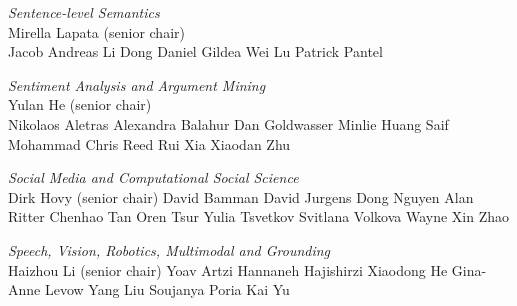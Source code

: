 \emph{Sentence-level Semantics} \\
\hspace*{0.2in}Mirella Lapata (senior chair) \\
\hspace*{0.2in}Jacob Andreas
\hspace*{0.2in}Li Dong
\hspace*{0.2in}Daniel Gildea
\hspace*{0.2in}Wei Lu
\hspace*{0.2in}Patrick Pantel


\emph{Sentiment Analysis and Argument Mining} \\
\hspace*{0.2in}Yulan He (senior chair) \\ 
\hspace*{0.2in}Nikolaos Aletras
\hspace*{0.2in}Alexandra Balahur
\hspace*{0.2in}Dan Goldwasser
\hspace*{0.2in}Minlie Huang
\hspace*{0.2in}Saif Mohammad
\hspace*{0.2in}Chris Reed
\hspace*{0.2in}Rui Xia
\hspace*{0.2in}Xiaodan Zhu


\emph{Social Media and Computational Social Science} \\
\hspace*{0.2in}Dirk Hovy (senior chair)
\hspace*{0.2in}David Bamman
\hspace*{0.2in}David Jurgens
\hspace*{0.2in}Dong Nguyen
\hspace*{0.2in}Alan Ritter
\hspace*{0.2in}Chenhao Tan
\hspace*{0.2in}Oren Tsur
\hspace*{0.2in}Yulia Tsvetkov
\hspace*{0.2in}Svitlana Volkova
\hspace*{0.2in}Wayne Xin Zhao


\emph{Speech, Vision, Robotics, Multimodal and Grounding} \\
\hspace*{0.2in}Haizhou Li (senior chair)
\hspace*{0.2in}Yoav Artzi
\hspace*{0.2in}Hannaneh Hajishirzi
\hspace*{0.2in}Xiaodong He
\hspace*{0.2in}Gina-Anne Levow
\hspace*{0.2in}Yang Liu
\hspace*{0.2in}Soujanya Poria
\hspace*{0.2in}Kai Yu


